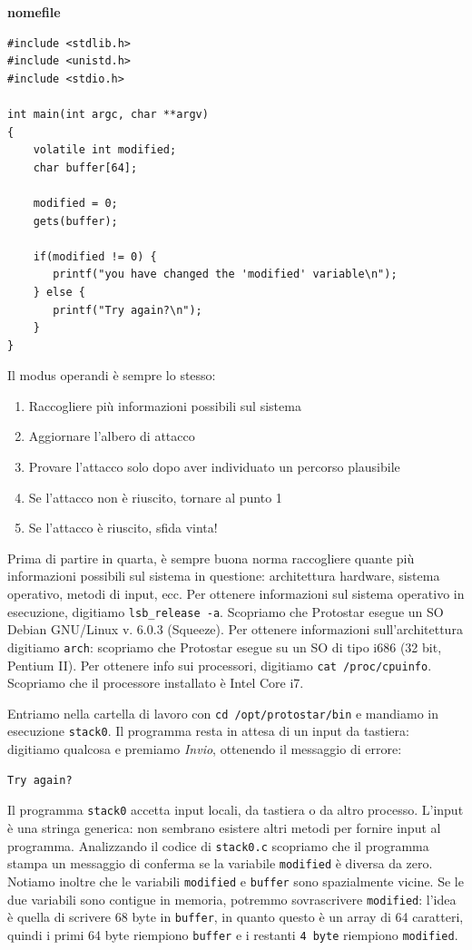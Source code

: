 \begin{mdframed}[backgroundcolor=white!20,shadow=false]
\textbf{nomefile}
\begin{verbatim}
#include <stdlib.h>
#include <unistd.h>
#include <stdio.h>

int main(int argc, char **argv)
{
    volatile int modified;
    char buffer[64];
    
    modified = 0;
    gets(buffer);
    
    if(modified != 0) {
       printf("you have changed the 'modified' variable\n");
    } else {
       printf("Try again?\n");
    }
}
\end{verbatim}
\end{mdframed}
Il modus operandi è sempre lo stesso:
\begin{enumerate}
    \item Raccogliere più informazioni possibili sul sistema
    \item Aggiornare l'albero di attacco
    \item Provare l'attacco solo dopo aver individuato un
percorso plausibile
    \item Se l'attacco non è riuscito, tornare al punto 1
    \item Se l'attacco è riuscito, sfida vinta! 
\end{enumerate}
Prima di partire in quarta, è sempre buona norma raccogliere quante più informazioni possibili sul sistema in questione: architettura hardware, sistema operativo, metodi di input, ecc. Per ottenere informazioni sul sistema operativo in esecuzione, digitiamo \texttt{lsb\_release -a}. Scopriamo che Protostar esegue un SO Debian GNU/Linux v. 6.0.3 (Squeeze). Per ottenere informazioni sull'architettura digitiamo \texttt{arch}: scopriamo che Protostar esegue su un SO di tipo i686 (32 bit, Pentium II). Per ottenere info sui processori, digitiamo \texttt{cat /proc/cpuinfo}. Scopriamo che il processore installato è Intel Core i7.

Entriamo nella cartella di lavoro con \texttt{cd /opt/protostar/bin} e mandiamo in esecuzione \texttt{stack0}. Il programma resta in attesa di un input da tastiera: digitiamo qualcosa e premiamo \textit{Invio}, ottenendo il messaggio di errore:
\begin{lstlisting}
Try again?
\end{lstlisting}

Il programma \texttt{stack0} accetta input locali, da tastiera o da altro processo. L'input è una stringa generica: non sembrano esistere altri metodi per fornire input al programma. Analizzando il codice di \texttt{stack0.c} scopriamo che il programma stampa un messaggio di conferma se la variabile \texttt{modified} è diversa da zero. Notiamo inoltre che le variabili \texttt{modified} e \texttt{buffer} sono spazialmente vicine. Se le due variabili sono contigue in memoria, potremmo sovrascrivere \texttt{modified}: l'idea è quella di scrivere 68 byte in \texttt{buffer}, in quanto questo è un array di 64 caratteri, quindi i primi 64 byte riempiono \texttt{buffer} e i restanti \texttt{4 byte} riempiono \texttt{modified}.

